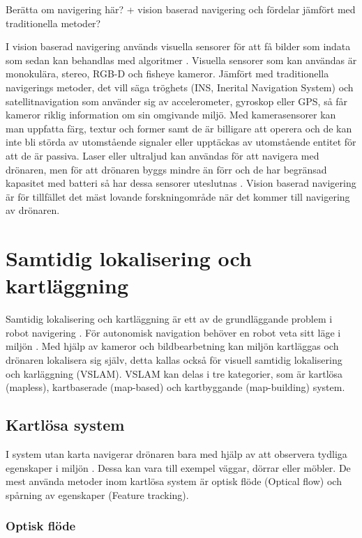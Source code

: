 Berätta om navigering här? + vision baserad navigering och fördelar jämfört med traditionella metoder?

I vision baserad navigering används visuella sensorer för att få bilder som indata som sedan kan behandlas med algoritmer \citep{geospatial}. Visuella sensorer som kan användas är monokulära, stereo, RGB-D och fisheye kameror. Jämfört med traditionella navigerings metoder, det vill säga tröghets (INS, Inerital Navigation System) och satellitnavigation som använder sig av accelerometer, gyroskop eller GPS, så får kameror riklig information om sin omgivande miljö. Med kamerasensorer kan man uppfatta färg, textur och former samt de är billigare att operera och de kan inte bli störda av utomstående signaler eller upptäckas av utomstående entitet för att de är passiva. Laser eller ultraljud kan användas för att navigera med drönaren, men för att drönaren byggs mindre än förr och de har begränsad kapasitet med batteri så har dessa sensorer uteslutnas \citep{geospatial, 6385934}. Vision baserad navigering är för tillfället det mäst lovande forskningområde när det kommer till navigering av drönaren.

\chapter{Samtidig lokalisering och kartläggning}

Samtidig lokalisering och kartläggning är ett av de grundläggande problem i robot navigering \citep{slamproblem}. För autonomisk navigation behöver en robot veta sitt läge i miljön \citep{geospatial}. Med hjälp av kameror och bildbearbetning kan miljön kartläggas och drönaren lokalisera sig själv, detta kallas också för visuell samtidig lokalisering och karläggning (VSLAM). VSLAM kan delas i tre kategorier, som är kartlösa (mapless), kartbaserade (map-based) och kartbyggande (map-building) system. 

\section{Kartlösa system}

I system utan karta navigerar drönaren bara med hjälp av att observera tydliga egenskaper i miljön \citep{982903}. Dessa kan vara till exempel väggar, dörrar eller möbler. De mest använda metoder inom kartlösa system är optisk flöde (Optical flow) och spårning av egenskaper (Feature tracking). 

\subsection{Optisk flöde}

